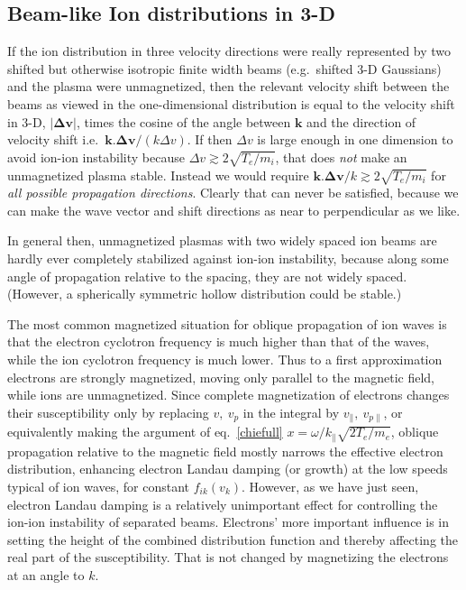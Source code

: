 \documentclass[12pt]{article}
\begin{document}
\subsection{Beam-like Ion distributions in 3-D}
If the ion distribution in three velocity directions were really
represented by two shifted but otherwise isotropic finite width beams
(e.g.\ shifted 3-D Gaussians) and the plasma were unmagnetized, then
the relevant velocity shift between the beams as viewed in the
one-dimensional distribution is equal to the velocity shift in 3-D,
$|\bm{\Delta v}|$, times the cosine of the angle between $\bm k$ and
the direction of velocity shift i.e.\
$\bm k.\bm{\Delta v}/(k\Delta v)$. If then $\Delta v$ is large enough
in one dimension to avoid ion-ion instability because
$\Delta v \gtrsim 2\sqrt{T_e/m_i}$, that does \emph{not} make an unmagnetized
plasma stable. Instead we would require
$\bm{k.\Delta v}/k \gtrsim 2\sqrt{T_e/m_i}$ for \emph{all possible
  propagation directions}. Clearly that can never be satisfied,
because we can make the wave vector and shift directions as near to
perpendicular as we like. 

In general then, unmagnetized plasmas with two widely spaced ion beams
are hardly ever completely stabilized against ion-ion instability,
because along some angle of propagation relative to the spacing, they are
not widely spaced. (However, a spherically symmetric hollow distribution could
be stable.)

The most common magnetized situation for oblique propagation of ion
waves is that the electron cyclotron frequency is much higher than
that of the waves, while the ion cyclotron frequency is much
lower. Thus to a first approximation electrons are strongly
magnetized, moving only parallel to the magnetic field, while ions are
unmagnetized. Since complete magnetization of electrons changes their
susceptibility only by replacing $v,\ v_p$ in the integral by
$v_\parallel,\ v_{p\parallel}$, or equivalently making the argument of
eq.\ \ref{chiefull} $x=\omega/k_\parallel \sqrt{2T_e/m_e}$, oblique
propagation relative to the magnetic field mostly narrows the
effective electron distribution, enhancing electron Landau damping (or
growth) at the low speeds typical of ion waves, for constant
$f_{ik}(v_k)$. However, as we have just seen, electron Landau damping
is a relatively unimportant effect for controlling the ion-ion
instability of separated beams. Electrons' more important influence is
in setting the height of the combined distribution function and
thereby affecting the real part of the susceptibility. That is not
changed by magnetizing the electrons at an angle to $k$.
\end{document}
